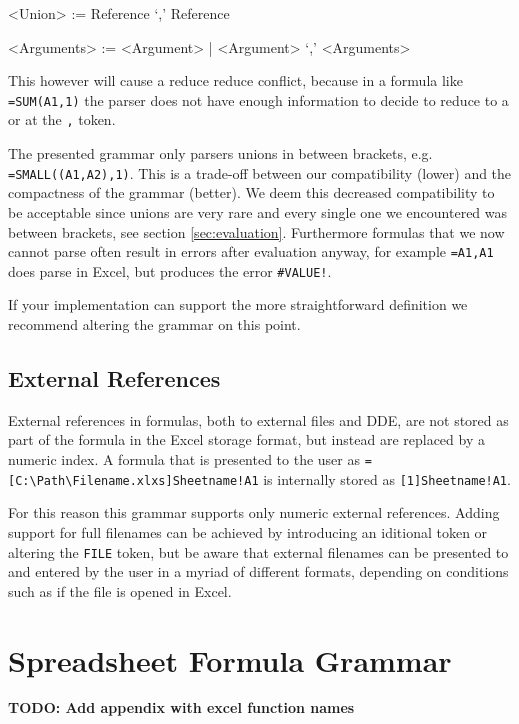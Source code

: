 \documentclass[conference]{IEEEtran}
\newcommand{\todo}[1]{\textbf{TODO: #1}}
\begin{document}
\begin{grammar}
<Union> := Reference `,' Reference

<Arguments> := <Argument> | <Argument> `,' <Arguments>
\end{grammar}

This however will cause a reduce reduce conflict, because in a formula like \texttt{=SUM(A1,1)} the parser does not have enough information to decide to reduce to a  or  at the \texttt{,} token.

The presented grammar only parsers unions in between brackets, e.g. \texttt{=SMALL((A1,A2),1)}.
This is a trade-off between our compatibility (lower) and the compactness of the grammar (better).
We deem this decreased compatibility to be acceptable since unions are very rare and every single one we encountered was between brackets, see section \ref{sec:evaluation}.
Furthermore formulas that we now cannot parse often result in errors after evaluation anyway, for example \texttt{=A1,A1} does parse in Excel, but produces the error \texttt{\#VALUE!}.

If your implementation can support the more straightforward definition we recommend altering the grammar on this point.

\subsection{External References}

External references in formulas, both to external files and DDE, are not stored as part of the formula in the Excel storage format, but instead are replaced by a numeric index.
A formula that is presented to the user as \texttt{=[C:\textbackslash Path\textbackslash Filename.xlxs]Sheetname!A1} is internally stored as \texttt{[1]Sheetname!A1}.

For this reason this grammar supports only numeric external references.
Adding support for full filenames can be achieved by introducing an iditional token or altering the \texttt{FILE} token, but be aware that external filenames can be presented to and entered by the user in a myriad of different formats, depending on conditions such as if the file is opened in Excel.

\section{Spreadsheet Formula Grammar}

\todo{Add appendix with excel function names}
\end{document}
